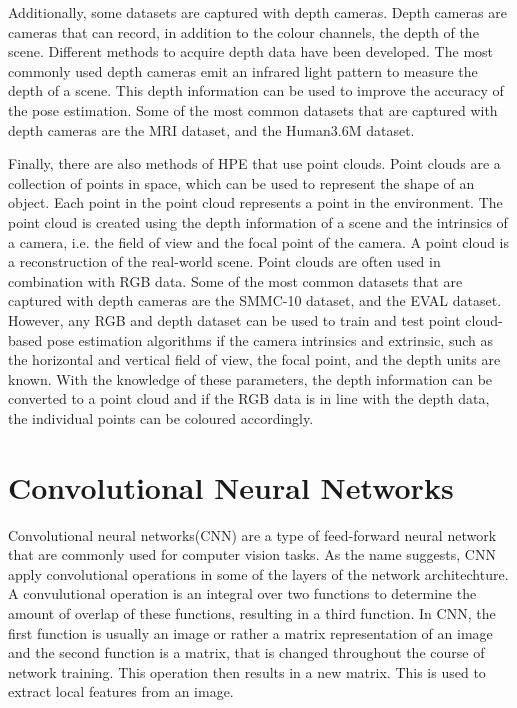 Additionally, some datasets are captured with depth cameras. Depth cameras are cameras that can record, in addition to the colour channels, the depth of the scene. Different methods to acquire depth data have been developed. The most commonly used depth cameras emit an infrared light pattern to measure the depth of a scene. This depth information can be used to improve the accuracy of the pose estimation. Some of the most common datasets that are captured with depth cameras are the MRI dataset\cite{mRI}, and the Human3.6M dataset\cite{h36m_pami}.

Finally, there are also methods of HPE that use point clouds. Point clouds are a collection of points in space, which can be used to represent the shape of an object. Each point in the point cloud represents a point in the environment. The point cloud is created using the depth information of a scene and the intrinsics of a camera, i.e. the field of view and the focal point of the camera. A point cloud is a reconstruction of the real-world scene. Point clouds are often used in combination with RGB data. Some of the most common datasets that are captured with depth cameras are the SMMC-10 dataset\cite{SMMC10}, and the EVAL dataset\cite{EVAL}. However, any RGB and depth dataset can be used to train and test point cloud-based pose estimation algorithms if the camera intrinsics and extrinsic, such as the horizontal and vertical field of view, the focal point, and the depth units are known. With the knowledge of these parameters, the depth information can be converted to a point cloud and if the RGB data is in line with the depth data, the individual points can be coloured accordingly.

\section{Convolutional Neural Networks}

Convolutional neural networks(CNN) are a type of feed-forward neural network that are commonly used for computer vision tasks. As the name suggests, CNN apply convolutional operations in some of the layers of the network architechture. A convulutional operation is an integral over two functions to determine the amount of overlap of these functions, resulting in a third function. In CNN, the first function is usually an image or rather a matrix representation of an image and the second function is a matrix, that is changed throughout the course of network training. This operation then results in a new matrix. This is used to extract local features from an image.


